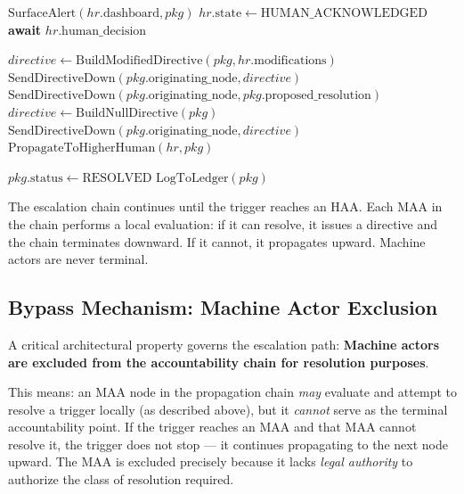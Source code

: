 \begin{algorithm}
\caption{Bailout Escalation Algorithm — Human Root-Level}
\begin{algorithmic}[1]
  \State $\text{SurfaceAlert}(hr.\text{dashboard}, pkg)$
  \State $hr.\text{state} \gets \text{HUMAN\_ACKNOWLEDGED}$
  \State \textbf{await} $hr.\text{human\_decision}$

    \State $directive \gets \text{BuildModifiedDirective}(pkg, hr.\text{modifications})$
    \State $\text{SendDirectiveDown}(pkg.\text{originating\_node}, directive)$
    \State $\text{SendDirectiveDown}(pkg.\text{originating\_node}, pkg.\text{proposed\_resolution})$
    \State $directive \gets \text{BuildNullDirective}(pkg)$
    \State $\text{SendDirectiveDown}(pkg.\text{originating\_node}, directive)$
    \State $\text{PropagateToHigherHuman}(hr, pkg)$
  \EndIf

  \State $pkg.\text{status} \gets \text{RESOLVED}$
  \State $\text{LogToLedger}(pkg)$
\EndProcedure
\end{algorithmic}
\end{algorithm}

The escalation chain continues until the trigger reaches an HAA. Each MAA in the chain performs a local evaluation: if it can resolve, it issues a directive and the chain terminates downward. If it cannot, it propagates upward. Machine actors are never terminal.

\subsection{Bypass Mechanism: Machine Actor Exclusion}
\label{sec:bypass-mechanism}

A critical architectural property governs the escalation path: \textbf{Machine actors are excluded from the accountability chain for resolution purposes}.

\medskip
\noindent This means: an MAA node in the propagation chain \emph{may} evaluate and attempt to resolve a trigger locally (as described above), but it \emph{cannot} serve as the terminal accountability point. If the trigger reaches an MAA and that MAA cannot resolve it, the trigger does not stop — it continues propagating to the next node upward. The MAA is excluded precisely because it lacks \emph{legal authority} to authorize the class of resolution required.

